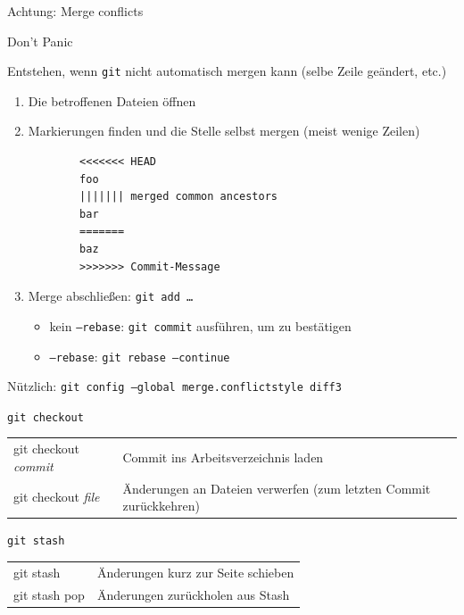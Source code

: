 \begin{frame}[fragile]{Achtung: Merge conflicts}
  \begin{center}
    \huge Don't Panic
  \end{center}

  Entstehen, wenn \texttt{git} nicht automatisch mergen kann (selbe Zeile geändert, etc.)

  \begin{enumerate}
    \item Die betroffenen Dateien öffnen
    \item Markierungen finden und die Stelle selbst mergen (meist wenige Zeilen)
      \begin{verbatim}
        <<<<<<< HEAD
        foo
        ||||||| merged common ancestors
        bar
        =======
        baz
        >>>>>>> Commit-Message
\end{verbatim}
    \item Merge abschließen: \texttt{git add …}
      \begin{itemize}
        \item kein \texttt{--rebase}: \texttt{git commit} ausführen, um zu bestätigen
        \item \texttt{--rebase}: \texttt{git rebase --continue}
      \end{itemize}
  \end{enumerate}
  Nützlich: \texttt{git config --global merge.conflictstyle diff3}
\end{frame}

\begin{frame}{\texttt{git checkout}}
  \begin{tabu}{>{\ttfamily}l X}
    git checkout \textit{commit} & Commit ins Arbeitsverzeichnis laden \\
    git checkout \textit{file}   & Änderungen an Dateien verwerfen (zum letzten Commit zurückkehren)
  \end{tabu}
\end{frame}

\begin{frame}{\texttt{git stash}}
  \begin{tabu}{>{\ttfamily}l X}
    git stash     & Änderungen kurz zur Seite schieben \\
    git stash pop & Änderungen zurückholen aus Stash
  \end{tabu}
\end{frame}

